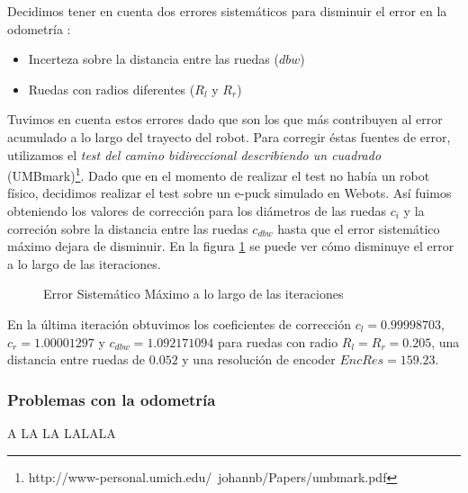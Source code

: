 Decidimos tener en cuenta dos errores sistem\'aticos para disminuir el error en la odometr\'ia :
\begin{itemize}
\item{Incerteza sobre la distancia entre las ruedas ($dbw$)}
\item{Ruedas con radios diferentes ($R_l$ y $R_r$)}
\end{itemize}
Tuvimos en cuenta estos errores dado que son los que m\'as contribuyen al error acumulado a lo
largo del trayecto del robot.
Para corregir \'estas fuentes de error, utilizamos el \emph{test del camino
bidireccional describiendo un cuadrado} (UMBmark)\footnote{http://www-personal.umich.edu/~johannb/Papers/umbmark.pdf}.
Dado que en el momento de realizar el test no hab\'ia un robot f\'isico, decidimos realizar el test sobre
un e-puck simulado en Webots.
As\'i fuimos obteniendo los valores de correcci\'on para los di\'ametros de las ruedas $c_i$ y la correci\'on
sobre la distancia entre las ruedas $c_{dbw}$ hasta que el error sistem\'atico m\'aximo dejara de disminuir. En la
figura \ref{fig:errsist} se puede ver c\'omo disminuye el error a lo largo de las iteraciones.

\begin{figure}[htp]
\begin{center}
\caption{Error Sistem\'atico M\'aximo a lo largo de las iteraciones}
\label{fig:errsist}
\end{center}
\end{figure}

En la \'ultima iteraci\'on obtuvimos los coeficientes de correcci\'on $c_l = 0.99998703$, $c_r = 1.00001297$
y $c_{dbw} = 1.092171094$ para ruedas con radio $R_l = R_r = 0.205$, una distancia entre ruedas de $0.052$ y
una resoluci\'on de encoder $EncRes = 159.23$.

\subsubsection{Problemas con la odometr\'ia}
\label{odometry:problems}
A LA LA LALALA

\newpage
